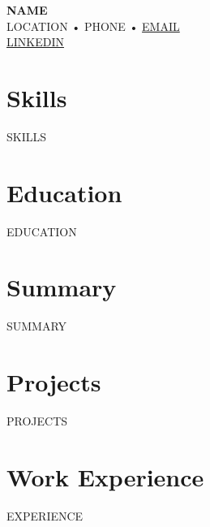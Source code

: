 \documentclass[11pt]{article}
\begin{document}
\noindent
\textbf{\LARGE {NAME}} \\
{LOCATION} • {PHONE} • \href{{mailto:{EMAIL}}}{{EMAIL}} \\
\href{{{LINKEDIN}}}{{{LINKEDIN}}}

\section*{Skills}
{SKILLS}

\section*{Education}
{EDUCATION}

\section*{Summary}
{SUMMARY}

\section*{Projects}
{PROJECTS}

\section*{Work Experience}
{EXPERIENCE}
\end{document}
